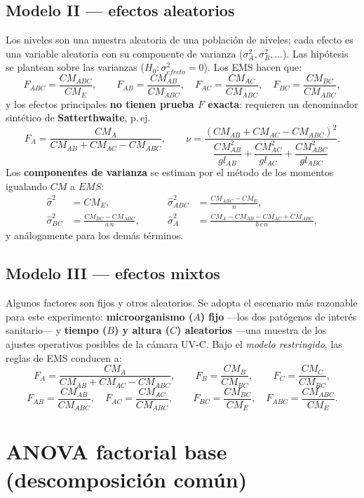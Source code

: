 \documentclass[12pt,a4paper]{article}
\begin{document}
\subsection{Modelo II --- efectos aleatorios}

Los niveles son una muestra aleatoria de una población de niveles; cada efecto es una variable aleatoria con su componente de varianza ($\sigma^2_A,\sigma^2_B,\dots$). Las hipótesis se plantean sobre las varianzas ($H_0:\sigma^2_{efecto}=0$). Los EMS hacen que:
\[
F_{ABC}=\frac{CM_{ABC}}{CM_E},\qquad
F_{AB}=\frac{CM_{AB}}{CM_{ABC}},\quad
F_{AC}=\frac{CM_{AC}}{CM_{ABC}},\quad
F_{BC}=\frac{CM_{BC}}{CM_{ABC}},
\]
y los efectos principales \textbf{no tienen prueba $F$ exacta}: requieren un denominador sintético de \textbf{Satterthwaite}, p.\,ej.
\[
F_A=\frac{CM_A}{CM_{AB}+CM_{AC}-CM_{ABC}},\qquad
\nu=\frac{(CM_{AB}+CM_{AC}-CM_{ABC})^2}{\dfrac{CM_{AB}^2}{gl_{AB}}+\dfrac{CM_{AC}^2}{gl_{AC}}+\dfrac{CM_{ABC}^2}{gl_{ABC}}} .
\]
Los \textbf{componentes de varianza} se estiman por el método de los momentos igualando $CM$ a $EMS$:
\[
\begin{aligned}
\hat\sigma^2&=CM_E, & \qquad
\hat\sigma^2_{ABC}&=\frac{CM_{ABC}-CM_E}{n},\\[4pt]
\hat\sigma^2_{BC}&=\frac{CM_{BC}-CM_{ABC}}{a\,n}, & \qquad
\hat\sigma^2_{A}&=\frac{CM_{A}-CM_{AB}-CM_{AC}+CM_{ABC}}{b\,c\,n},
\end{aligned}
\]
y análogamente para los demás términos.

\subsection{Modelo III --- efectos mixtos}

Algunos factores son fijos y otros aleatorios. Se adopta el escenario más razonable para este experimento: \textbf{microorganismo ($A$) fijo} ---los dos patógenos de interés sanitario--- y \textbf{tiempo ($B$) y altura ($C$) aleatorios} ---una muestra de los ajustes operativos posibles de la cámara UV-C. Bajo el \emph{modelo restringido}, las reglas de EMS conducen a:
\[
F_A=\frac{CM_A}{CM_{AB}+CM_{AC}-CM_{ABC}},\qquad
F_B=\frac{CM_B}{CM_{BC}},\qquad
F_C=\frac{CM_C}{CM_{BC}},
\]
\[
F_{AB}=\frac{CM_{AB}}{CM_{ABC}},\quad
F_{AC}=\frac{CM_{AC}}{CM_{ABC}},\qquad
F_{BC}=\frac{CM_{BC}}{CM_E},\quad
F_{ABC}=\frac{CM_{ABC}}{CM_E}.
\]

\section{ANOVA factorial base (descomposición común)}
\end{document}
